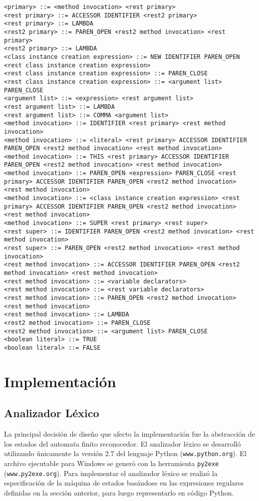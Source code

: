 \documentclass [a4paper,abstracton,titlepage]{scrartcl}
\begin{document}
\begin{lstlisting}
<primary> ::= <method invocation> <rest primary>
<rest primary> ::= ACCESSOR IDENTIFIER <rest2 primary>
<rest primary> ::= LAMBDA
<rest2 primary> ::= PAREN_OPEN <rest2 method invocation> <rest primary>
<rest2 primary> ::= LAMBDA
<class instance creation expression> ::= NEW IDENTIFIER PAREN_OPEN <rest class instance creation expression>
<rest class instance creation expression> ::= PAREN_CLOSE
<rest class instance creation expression> ::= <argument list> PAREN_CLOSE
<argument list> ::= <expression> <rest argument list>
<rest argument list> ::= LAMBDA
<rest argument list> ::= COMMA <argument list>
<method invocation> ::= IDENTIFIER <rest primary> <rest method invocation>
<method invocation> ::= <literal> <rest primary> ACCESSOR IDENTIFIER PAREN_OPEN <rest2 method invocation> <rest method invocation>
<method invocation> ::= THIS <rest primary> ACCESSOR IDENTIFIER PAREN_OPEN <rest2 method invocation> <rest method invocation>
<method invocation> ::= PAREN_OPEN <expression> PAREN_CLOSE <rest primary> ACCESSOR IDENTIFIER PAREN_OPEN <rest2 method invocation> <rest method invocation>
<method invocation> ::= <class instance creation expression> <rest primary> ACCESSOR IDENTIFIER PAREN_OPEN <rest2 method invocation> <rest method invocation>
<method invocation> ::= SUPER <rest primary> <rest super>
<rest super> ::= IDENTIFIER PAREN_OPEN <rest2 method invocation> <rest method invocation>
<rest super> ::= PAREN_OPEN <rest2 method invocation> <rest method invocation>
<rest method invocation> ::= ACCESSOR IDENTIFIER PAREN_OPEN <rest2 method invocation> <rest method invocation>
<rest method invocation> ::= <variable declarators>
<rest method invocation> ::= <rest variable declarators>
<rest method invocation> ::= PAREN_OPEN <rest2 method invocation> <rest method invocation>
<rest method invocation> ::= LAMBDA
<rest2 method invocation> ::= PAREN_CLOSE
<rest2 method invocation> ::= <argument list> PAREN_CLOSE
<boolean literal> ::= TRUE
<boolean literal> ::= FALSE\end{lstlisting}


\hypertarget{_implementación}{}
\section{Implementación}
\subsection{Analizador Léxico}
\label{_implementación}
La principal decisión de diseño que afecto la implementación fue la abstracción de los estados del automata finito reconocedor.
El analizador léxico se desarrolló utilizando únicamente la versión 2.7 del lenguaje Python (\texttt{www.python.org}).
El archivo ejecutable para Windows se generó con la herramienta \texttt{py2exe} (\texttt{www.py2exe.org}).
Para implementar el analizador léxico se realizó la especificación de la máquina
de estados basándose en las expresiones regulares definidas en la sección
anterior, para luego representarlo en código Python.
\hypertarget{_archivos_y_clases}{}
\end{document}
